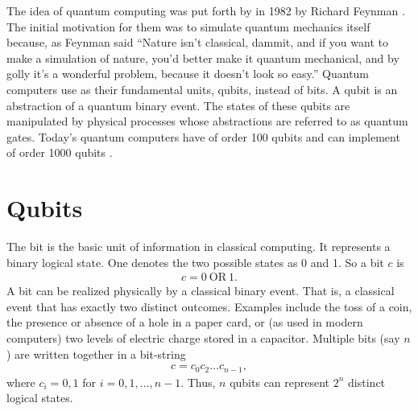 \documentclass[10pt]{article}
\begin{document}
The idea of quantum computing was put forth by in 1982 by Richard Feynman \cite{ref:feynman}. The initial motivation for them was to simulate quantum mechanics itself because, as Feynman said “Nature isn't classical, dammit, and if you want to make a simulation of nature, you'd better make it quantum mechanical, and by golly it's a wonderful problem, because it doesn't look so easy.” Quantum computers use as their fundamental units, qubits, instead of bits. A qubit is an abstraction of a quantum binary event. The states of these qubits are manipulated by physical processes whose abstractions are referred to as quantum gates. Today's quantum computers have of order 100 qubits and can implement of order 1000 qubits \cite{eagle}.

\section{Qubits}

\quad The bit is the basic unit of information in classical computing. It represents a  binary logical state. One denotes the two possible states as 0 and 1. So a bit $c$ is
\begin{align}
c = 0 \ \text{OR} \ 1
.\end{align}
A bit can be realized physically by a classical binary event. That is, a classical event that has exactly two distinct outcomes. Examples include the toss of a coin, the presence or absence of a hole in a paper card, or (as used in modern computers) two levels of electric charge stored in a capacitor. Multiple bits (say $n$) are written together in a bit-string
\begin{align}
c = c_0c_2\ldots c_{n-1}
,\end{align}
where $c_i=0,1$ for $i=0,1,\ldots ,n-1$. Thus, $n$ qubits can represent $2^n$ distinct logical states.
\end{document}
